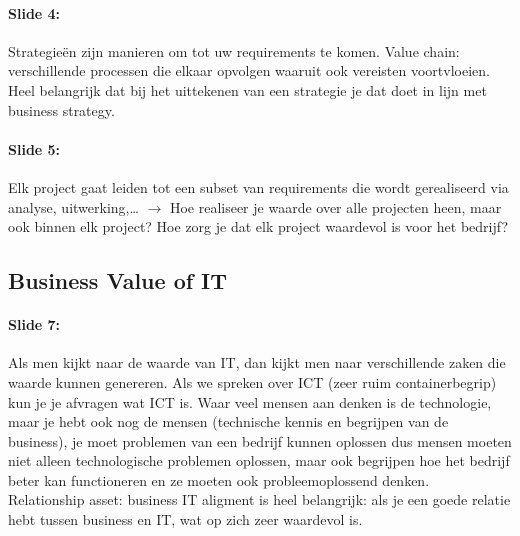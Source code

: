 \documentclass[10pt,a4paper]{report}
\begin{document}
\paragraph{Slide 4:}Strategieën zijn manieren om tot uw requirements te komen. Value chain: verschillende processen die elkaar opvolgen waaruit ook vereisten voortvloeien. Heel belangrijk dat bij het uittekenen van een strategie je dat doet in lijn met business strategy.

\paragraph{Slide 5:}Elk project gaat leiden tot een subset van requirements die wordt gerealiseerd via analyse, uitwerking,… $\rightarrow$ 
Hoe realiseer je waarde over alle projecten heen, maar ook binnen elk project? Hoe zorg je dat elk project waardevol is voor het bedrijf?

\subsection{Business Value of IT}
\paragraph{Slide 7:}Als men kijkt naar de waarde van IT, dan kijkt men naar verschillende zaken die waarde kunnen genereren. Als we spreken over ICT (zeer ruim containerbegrip) kun je je afvragen wat ICT is. 
Waar veel mensen aan denken is de technologie, maar je hebt ook nog de mensen (technische kennis en begrijpen van de business), je moet problemen van een bedrijf kunnen oplossen dus mensen moeten niet alleen technologische problemen oplossen, maar ook begrijpen hoe het bedrijf beter kan functioneren en ze moeten ook probleemoplossend denken.\\
Relationship asset: business IT aligment is heel belangrijk: als je een goede relatie hebt tussen business en IT, wat op zich zeer waardevol is.
\end{document}
